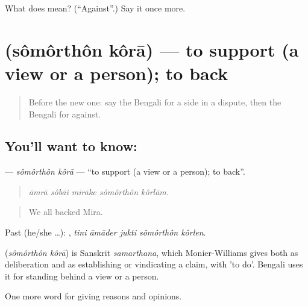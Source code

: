 \begin{tcolorbox}[breakable,colback=teal!4,colframe=teal!35!black,title={Before you move on}]
What does  mean? (\textquotedblleft{}Against\textquotedblright{}.) Say it once more.
\end{tcolorbox}
\section[\texorpdfstring{\bn{সমর্থন} \bn{করা} (sômôrthôn kôrā)}{সমর্থন করা (sômôrthôn kôrā)}]{  (sômôrthôn kôrā) — to support (a view or a person); to back}

\label{lesson:BN-C333-somorthon-kora}



\begin{quote}
Before the new one: say the Bengali for a side in a dispute, then the Bengali for against.
\end{quote}

\subsection*{You'll want to know:  }
\textbf{ } — \emph{sômôrthôn kôrā} — \textquotedblleft{}to support (a view or a person); to back\textquotedblright{}.

\begin{quote}
    
\end{quote}

\begin{quote}
\emph{āmrā sôbāi mīrāke sômôrthôn kôrlām.}
\end{quote}

\begin{quote}
We all backed Mira.
\end{quote}

Past (he/she …):     , \emph{tini āmāder jukti sômôrthôn kôrlen}.

\begin{cousinweb}
\textbf{ } (\emph{sômôrthôn kôrā}) is Sanskrit \emph{samarthana}, which Monier-Williams gives both as deliberation and as establishing or vindicating a claim, with  'to do'. Bengali uses it for standing behind a view or a person.
\end{cousinweb}

\begin{grammarlens}[title={What you've built}]
One more word for giving reasons and opinions.
\end{grammarlens}

